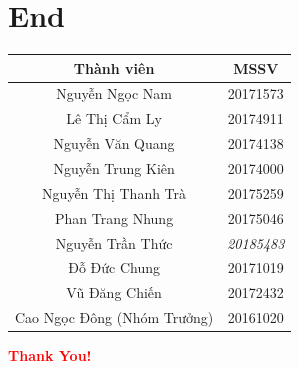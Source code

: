 \documentclass[10pt]{beamer}
\begin{document}
\section*{End}
\begin{frame}
\transsplitverticalin
\centering
\begin{tabular}{|c||c|}
\hline 
\textbf{Thành viên} & \textbf{MSSV} \\ 
\hline 
Nguyễn Ngọc Nam & 20171573 \\ 
\hline 
Lê Thị Cẩm Ly & 20174911 \\ 
\hline 
Nguyễn Văn Quang & 20174138 \\ 
\hline 
Nguyễn Trung Kiên  & 20174000 \\ 
\hline 
Nguyễn Thị Thanh Trà  & 20175259 \\ 
\hline 
Phan Trang Nhung  & 20175046 \\ 
\hline 
Nguyễn Trần Thức  & \textit{20185483} \\ 
\hline 
Đỗ Đức Chung & 20171019 \\ 
\hline 
Vũ Đăng Chiến  & 20172432 \\ 
\hline 
Cao Ngọc Đông 
(Nhóm Trưởng)
 & 20161020 \\ 
\hline 
\end{tabular}

\hyperlink{contents}{}
\end{frame}

\begin{frame}
\transsplitverticalout
\centering
{\fontsize{40}{50} \textcolor{red}{\textbf{Thank You!}}}
\end{frame}
\end{document}
